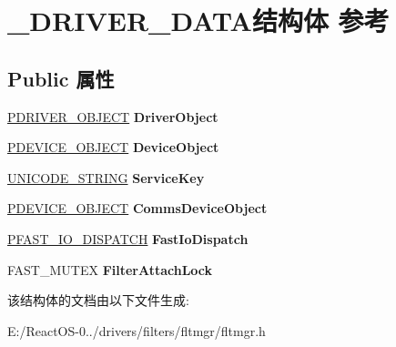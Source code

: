 \hypertarget{struct___d_r_i_v_e_r___d_a_t_a}{}\section{\+\_\+\+D\+R\+I\+V\+E\+R\+\_\+\+D\+A\+T\+A结构体 参考}
\label{struct___d_r_i_v_e_r___d_a_t_a}
\subsection*{Public 属性}
\begin{DoxyCompactItemize}
\item 
\mbox{\label{struct___d_r_i_v_e_r___d_a_t_a_a6981eac3494d4558b606e1ead85591ad}} 
\hyperlink{struct___d_r_i_v_e_r___o_b_j_e_c_t}{P\+D\+R\+I\+V\+E\+R\+\_\+\+O\+B\+J\+E\+CT} {\bfseries Driver\+Object}
\item 
\mbox{\label{struct___d_r_i_v_e_r___d_a_t_a_af05ab4e18aaa65a7385e4828d427a27d}} 
\hyperlink{struct___d_e_v_i_c_e___o_b_j_e_c_t}{P\+D\+E\+V\+I\+C\+E\+\_\+\+O\+B\+J\+E\+CT} {\bfseries Device\+Object}
\item 
\mbox{\label{struct___d_r_i_v_e_r___d_a_t_a_a6e6120de408c7c5630706ea06a9af7dc}} 
\hyperlink{struct___u_n_i_c_o_d_e___s_t_r_i_n_g}{U\+N\+I\+C\+O\+D\+E\+\_\+\+S\+T\+R\+I\+NG} {\bfseries Service\+Key}
\item 
\mbox{\label{struct___d_r_i_v_e_r___d_a_t_a_a746e04a8b1f2e928ef1145c1e587aaf2}} 
\hyperlink{struct___d_e_v_i_c_e___o_b_j_e_c_t}{P\+D\+E\+V\+I\+C\+E\+\_\+\+O\+B\+J\+E\+CT} {\bfseries Comms\+Device\+Object}
\item 
\mbox{\label{struct___d_r_i_v_e_r___d_a_t_a_ac99146c2f6083ac954b91a35ba14b4b3}} 
\hyperlink{struct___f_a_s_t___i_o___d_i_s_p_a_t_c_h}{P\+F\+A\+S\+T\+\_\+\+I\+O\+\_\+\+D\+I\+S\+P\+A\+T\+CH} {\bfseries Fast\+Io\+Dispatch}
\item 
\mbox{\label{struct___d_r_i_v_e_r___d_a_t_a_ae580e6afa1c3a5b478a521039d6701b7}} 
F\+A\+S\+T\+\_\+\+M\+U\+T\+EX {\bfseries Filter\+Attach\+Lock}
\end{DoxyCompactItemize}


该结构体的文档由以下文件生成\+:\begin{DoxyCompactItemize}
\item 
E\+:/\+React\+O\+S-\/0../drivers/filters/fltmgr/fltmgr.\+h\end{DoxyCompactItemize}
